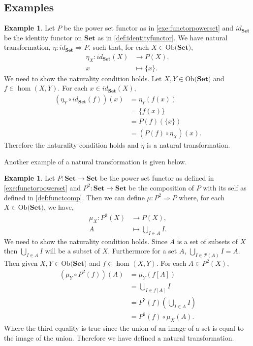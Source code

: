 \documentclass[11pt,a4paper]{article}
\theoremstyle{definition}
\newtheorem{example}[thm]{Example}
\newcommand\ho[3][]{\hom_{#1}(#2,#3)}
\newcommand\ob[1]{\mathrm{Ob(}#1\mathrm{)}}
\newcommand\nattran[3]{#1\colon#2\Rightarrow#3}
\numberwithin{equation}{section}
\begin{document}
\subsection{Examples}
\label{ss:nattranexam}
\begin{example}
\label{exe:naturalidentpowerset}
Let $P$ be the power set functor as in \ref{exe:functorpowerset} and $id_{\mathbf{Set}}$ be the identity functor on $\mathbf{Set}$ as in \ref{def:identityfunctor}. We have natural transformation, $\nattran{\eta}{id_{\mathbf{Set}}}{P}$. such that,  for  each $X\in\ob{\mathbf{Set}}$, 
\begin{align*}
    \eta_{X}\colon id_{\mathbf{Set}}(X)&\rightarrow P(X),\\
    x&\mapsto \{x\}.
\end{align*}
We need to show the naturality condition holds. Let
$X,Y\in\ob{\mathbf{Set}}$ and $f\in\ho{X}{Y}$. For each $x\in id_{\mathbf{Set}}(X)$,
\begin{align*}
    (\eta_{Y}\circ id_{\mathbf{Set}}(f))(x) &= \eta_{Y}(f(x))\\
    &= \{f(x)\}\\
    &= P(f)(\{x\})\\
    &= (P(f)\circ \eta_{X})(x).
\end{align*}
Therefore the naturality condition holds and $\eta$ is a natural transformation.
\end{example}
Another example of a natural transformation is given below.
\begin{example}
\label{exe:naturalmultipowerset}
Let $P\colon\mathbf{Set}\rightarrow\mathbf{Set}$ be the power set functor as defined in \ref{exe:functorpowerset} and $P^2:\mathbf{Set}\rightarrow\mathbf{Set}$ be the composition of $P$ with its self as defined in \ref{def:functcomp}. Then we can define $\mu\colon P^2 \Rightarrow P$ where, for each $X\in\ob{\mathbf{Set}}$, we have,
\begin{align*}
    \mu_{X}\colon P^2(X)&\rightarrow P(X),\\
    A &\mapsto \bigcup_{I \in A} I. 
\end{align*}
We need to show the naturality condition holds. Since $A$ is a set of subsets of $X$ then $\bigcup_{I\in A}I$ will be a subset of $X$. Furthermore for a set $A$, $\bigcup_{I\in\mathcal P(A)}I=A$. Then given $X,Y\in\ob{\mathbf{Set}}$ and $f\in\ho{X}{Y}$. For each $A\in P^2(X)$,
\begin{align*}
    (\mu_{Y}\circ P^2(f))(A) &= \mu_{Y}(f[A])\\
    &= \bigcup_{I\in f[A]} I\\
    &= P^2(f)(\bigcup_{I\in A}I)\\
    &= P^2(f)\circ \mu_{X}(A).
\end{align*}
Where the third equality is true since the union of an image of a set is equal to the image of the union. Therefore we have defined a natural transformation.
\end{example}
\end{document}
